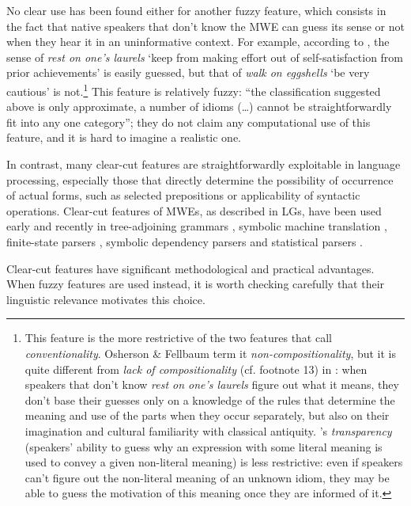 \documentclass[output=paper]{langsci/langscibook}
\begin{document}
No clear use has been found either for another fuzzy feature, which consists in the fact that native speakers that don’t know the MWE can guess its sense or not when they hear it in an uninformative context. For example, according to   \citet[3]{Osherson2010}, the sense of\textit{ rest on one’s laurels} ‘keep from making effort out of self-satisfaction from prior achievements’ is easily guessed, but that of \textit{walk on eggshells} ‘be very cautious’ is not.\footnote{  This feature is the more restrictive of the two features that \citet[495]{Nunberg1994} call \textit{conventionality}. Osherson \& Fellbaum term it \textit{non-compositionality}, but it is quite different from \textit{lack of compositionality} (cf. footnote 13) in \citet[128-129]{Danlos1988}: when speakers that don’t know \textit{rest on one’s laurels} figure out what it means, they don’t base their guesses only on a knowledge of the rules that determine the meaning and use of the parts when they occur separately, but also on their imagination and cultural familiarity with classical antiquity. \citet[496–497]{Nunberg1994}’s  \textit{transparency} (speakers’ ability to guess why an expression with some literal meaning is used to convey a given non-literal meaning) is less restrictive: even if speakers can’t figure out the non-literal meaning of an unknown idiom, they may be able to guess the motivation of this meaning once they are informed of it.} This feature is relatively fuzzy: “the classification suggested above is only approximate, a number of idioms (\ldots) cannot be straightforwardly fit into any one category”; they do not claim any computational use of this feature, and it is hard to imagine a realistic one.

In contrast, many clear-cut features are straightforwardly exploitable in language processing, especially those that directly determine the possibility of occurrence of actual forms, such as selected prepositions or applicability of syntactic operations. Clear-cut features of MWEs, as described in LGs, have been used early and recently in tree-adjoining grammars \citep{Abeille88}, symbolic machine translation \citep{Danlos1992}, finite-state parsers \citep{Senellart1998}, symbolic dependency parsers \citep{Tolone2011} and statistical parsers \citep{Constant}.

Clear-cut features have significant methodological and practical advantages. When fuzzy features are used instead, it is worth checking carefully that their linguistic relevance motivates this choice.
\end{document}
